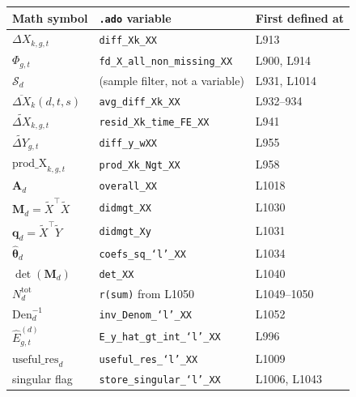 \documentclass[11pt]{article}
\newcommand{\code}[1]{\texttt{\small #1}}
\newcommand{\1}{\mathbb{1}}
\newcommand{\Smpl}{\mathcal{S}}
\newcommand{\thetad}{\widehat{\bm{\theta}}_d}
\newcommand{\dXk}{\Delta X_{k,g,t}}
\newcommand{\dXbar}{\overline{\Delta X}}
\begin{document}
\begin{tabular}{@{}lll@{}}
\toprule
Math symbol & \texttt{.ado} variable & First defined at \\
\midrule
$\dXk$                                       & \code{diff\_X{k}\_XX}              & L913 \\
$\Phi_{g,t}$                                 & \code{fd\_X\_all\_non\_missing\_XX}& L900, L914 \\
$\Smpl_d$                                    & (sample filter, not a variable)    & L931, L1014 \\
$\dXbar_k(d,t,s)$                            & \code{avg\_diff\_X{k}\_XX}         & L932--934 \\
$\widetilde{\Delta X}_{k,g,t}$               & \code{resid\_X{k}\_time\_FE\_XX}   & L941 \\
$\widetilde{\Delta Y}_{g,t}$                 & \code{diff\_y\_wXX}                & L955 \\
$\mathrm{prod\_X}_{k,g,t}$                   & \code{prod\_X{k}\_Ngt\_XX}         & L958 \\
$\bm{A}_d$                                   & \code{overall\_XX}                 & L1018 \\
$\bm{M}_d = \widetilde{X}^{\top}\widetilde{X}$ & \code{didmgt\_XX}                & L1030 \\
$\bm{q}_d = \widetilde{X}^{\top}\widetilde{Y}$ & \code{didmgt\_Xy}                & L1031 \\
$\thetad$                                    & \code{coefs\_sq\_`l'\_XX}          & L1034 \\
$\det(\bm{M}_d)$                             & \code{det\_XX}                     & L1040 \\
$N_d^{\mathrm{tot}}$                         & \code{r(sum)} from L1050           & L1049--1050 \\
$\mathrm{Den}_d^{-1}$                        & \code{inv\_Denom\_`l'\_XX}         & L1052 \\
$\widehat{E}_{g,t}^{(d)}$                    & \code{E\_y\_hat\_gt\_int\_`l'\_XX} & L996 \\
$\mathrm{useful\_res}_d$                     & \code{useful\_res\_`l'\_XX}        & L1009 \\
singular flag                                & \code{store\_singular\_`l'\_XX}    & L1006, L1043 \\
\bottomrule
\end{tabular}
\end{document}
